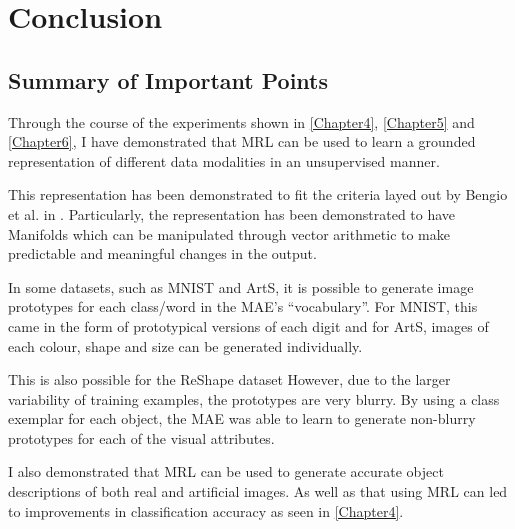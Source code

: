 
\chapter{Conclusion} %

\label{Chapter7} %



\section{Summary of Important Points}
Through the course of the experiments shown in \autoref{Chapter4}, \autoref{Chapter5} and \autoref{Chapter6}, I have demonstrated that  \ac{MRL} can be used to learn a grounded representation of different data modalities in an unsupervised manner.

This representation has been demonstrated to fit the criteria layed out by Bengio et al. in \cite{repRev}. Particularly, the representation has been demonstrated to have Manifolds which can be manipulated through vector arithmetic to make predictable and meaningful changes in the output.

In some datasets, such as MNIST and ArtS, it is possible to generate image prototypes for each class/word in the \ac{MAE}'s ``vocabulary''. For MNIST, this came in the form of prototypical versions of each digit and for ArtS, images of each colour, shape and size can be generated individually.

This is also possible for the ReShape dataset However, due to the larger variability of training examples, the prototypes are very blurry. By using a class exemplar for each object, the \ac{MAE} was able to learn to generate non-blurry prototypes for each of the visual attributes.

I also demonstrated that \ac{MRL} can be used to generate accurate object descriptions of both real and artificial images. As well as that using \ac{MRL} can led to improvements in classification accuracy as seen in \autoref{Chapter4}.

